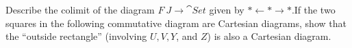 \documentclass[12pt]{memoir}
\begin{document}
    \begin{Ej}[1.3.Q]
        Describe the colimit of the diagram $F\: J\to\cat{Set}$ given by $\ast\leftarrow\ast\to\ast$.If the two squares in the following commutative diagram are Cartesian
  diagrams, show that the ``outside rectangle'' (involving $U, V, Y$, and $Z$) is also a Cartesian diagram.
  \end{Ej}
  \begin{figure}[h]
      \centering
  \end{figure}
  
\end{document}
